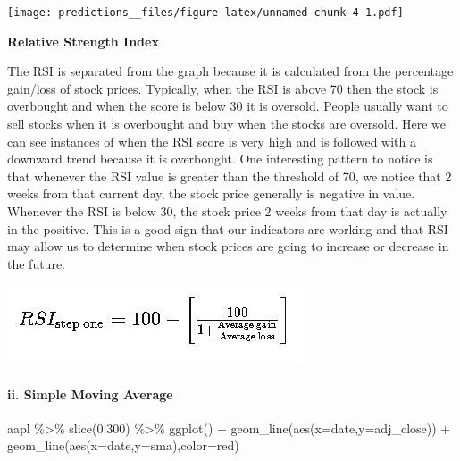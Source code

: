 \documentclass[
]{article}
\newenvironment{Shaded}{\begin{snugshade}}{\end{snugshade}}
\newcommand{\AttributeTok}[1]{\textcolor[rgb]{0.77,0.63,0.00}{#1}}
\newcommand{\DecValTok}[1]{\textcolor[rgb]{0.00,0.00,0.81}{#1}}
\newcommand{\FunctionTok}[1]{\textcolor[rgb]{0.00,0.00,0.00}{#1}}
\newcommand{\NormalTok}[1]{#1}
\newcommand{\SpecialCharTok}[1]{\textcolor[rgb]{0.00,0.00,0.00}{#1}}
\newcommand{\StringTok}[1]{\textcolor[rgb]{0.31,0.60,0.02}{#1}}
\begin{document}
\texttt{[image: predictions\_\_files/figure-latex/unnamed-chunk-4-1.pdf]}

\textbf{Relative Strength Index}

The RSI is separated from the graph because it is calculated from the
percentage gain/loss of stock prices. Typically, when the RSI is above
70 then the stock is overbought and when the score is below 30 it is
oversold. People usually want to sell stocks when it is overbought and
buy when the stocks are oversold. Here we can see instances of when the
RSI score is very high and is followed with a downward trend because it
is overbought. One interesting pattern to notice is that whenever the
RSI value is greater than the threshold of 70, we notice that 2 weeks
from that current day, the stock price generally is negative in value.
Whenever the RSI is below 30, the stock price 2 weeks from that day is
actually in the positive. This is a good sign that our indicators are
working and that RSI may allow us to determine when stock prices are
going to increase or decrease in the future.

\includegraphics{images/Capture.JPG}

\hypertarget{ii.-simple-moving-average}{%
\paragraph{ii. Simple Moving Average}\label{ii.-simple-moving-average}}

\begin{Shaded}
\begin{Highlighting}[]
\NormalTok{aapl }\SpecialCharTok{\%\textgreater{}\%} 
  \FunctionTok{slice}\NormalTok{(}\DecValTok{0}\SpecialCharTok{:}\DecValTok{300}\NormalTok{) }\SpecialCharTok{\%\textgreater{}\%}
  \FunctionTok{ggplot}\NormalTok{() }\SpecialCharTok{+}
  \FunctionTok{geom\_line}\NormalTok{(}\FunctionTok{aes}\NormalTok{(}\AttributeTok{x=}\NormalTok{date,}\AttributeTok{y=}\NormalTok{adj\_close)) }\SpecialCharTok{+}
  \FunctionTok{geom\_line}\NormalTok{(}\FunctionTok{aes}\NormalTok{(}\AttributeTok{x=}\NormalTok{date,}\AttributeTok{y=}\NormalTok{sma),}\AttributeTok{color=}\StringTok{\textquotesingle{}red\textquotesingle{}}\NormalTok{)}
\end{Highlighting}
\end{Shaded}
\end{document}
